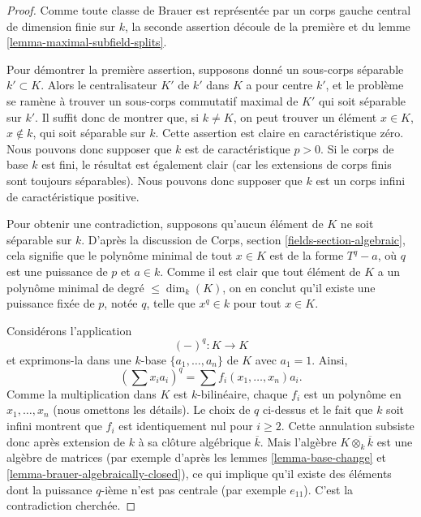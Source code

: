 \begin{proof}
Comme toute classe de Brauer est représentée par un corps gauche central de dimension
finie sur $k$, la seconde assertion découle de la
première et du
lemme \ref{lemma-maximal-subfield-splits}.

\medskip\noindent
Pour démontrer la première assertion, supposons donné un sous-corps séparable
$k' \subset K$. Alors le centralisateur $K'$ de $k'$ dans $K$
a pour centre $k'$, et le problème se ramène à trouver un sous-corps commutatif
maximal de $K'$ qui soit séparable sur $k'$. Il suffit donc de montrer que, si
$k \not = K$, on peut trouver un élément $x \in K$, $x \not \in k$,
qui soit séparable sur $k$. Cette assertion est claire en caractéristique
zéro. Nous pouvons donc supposer que $k$ est de caractéristique $p > 0$. Si le
corps de base $k$ est fini, le résultat est également clair (car les
extensions de corps finis sont toujours séparables). Nous pouvons donc supposer
que $k$ est un corps infini de caractéristique positive.

\medskip\noindent
Pour obtenir une contradiction, supposons qu'aucun élément de $K$ ne soit séparable sur $k$.
D'après la discussion de
Corps, section \ref{fields-section-algebraic},
cela signifie que le polynôme minimal de tout $x \in K$ est de la forme
$T^q - a$, où $q$ est une puissance de $p$ et $a \in k$. Comme il est
clair que tout élément de $K$ a un polynôme minimal de degré
$\leq \dim_k(K)$, on en conclut qu'il existe une puissance fixée de $p$, notée
$q$, telle que $x^q \in k$ pour tout $x \in K$.

\medskip\noindent
Considérons l'application
$$
(-)^q : K \longrightarrow K
$$
et exprimons-la dans une $k$-base $\{a_1, \ldots, a_n\}$ de $K$
avec $a_1 = 1$. Ainsi,
$$
(\sum x_i a_i)^q = \sum f_i(x_1, \ldots, x_n)a_i.
$$
Comme la multiplication dans $K$ est $k$-bilinéaire, chaque $f_i$
est un polynôme en $x_1, \ldots, x_n$ (nous omettons les détails).
Le choix de $q$ ci-dessus et le fait que $k$ soit infini montrent que
$f_i$ est identiquement nul pour $i \geq 2$. Cette annulation subsiste donc
après extension de $k$ à sa clôture algébrique $\overline{k}$. Mais
l'algèbre $K \otimes_k \overline{k}$ est une algèbre de matrices (par exemple d'après les
lemmes \ref{lemma-base-change} et \ref{lemma-brauer-algebraically-closed}),
ce qui implique qu'il existe des éléments dont la puissance $q$-ième n'est pas centrale
(par exemple $e_{11}$). C'est la contradiction cherchée.
\end{proof}

